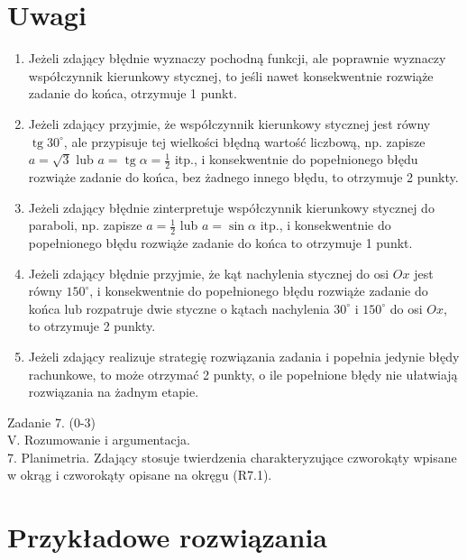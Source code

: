 \documentclass[10pt]{article}
\begin{document}
\section*{Uwagi}
\begin{enumerate}
  \item Jeżeli zdający błędnie wyznaczy pochodną funkcji, ale poprawnie wyznaczy współczynnik kierunkowy stycznej, to jeśli nawet konsekwentnie rozwiąże zadanie do końca, otrzymuje 1 punkt.
  \item Jeżeli zdający przyjmie, że współczynnik kierunkowy stycznej jest równy $\operatorname{tg} 30^{\circ}$, ale przypisuje tej wielkości błędną wartość liczbową, np. zapisze $a=\sqrt{3}$ lub $a=\operatorname{tg} \alpha=\frac{1}{2}$ itp., i konsekwentnie do popełnionego błędu rozwiąże zadanie do końca, bez żadnego innego błędu, to otrzymuje 2 punkty.
  \item Jeżeli zdający błędnie zinterpretuje współczynnik kierunkowy stycznej do paraboli, np. zapisze $a=\frac{1}{2}$ lub $a=\sin \alpha$ itp., i konsekwentnie do popełnionego błędu rozwiąże zadanie do końca to otrzymuje 1 punkt.
  \item Jeżeli zdający błędnie przyjmie, że kąt nachylenia stycznej do osi $O x$ jest równy $150^{\circ}$, i konsekwentnie do popełnionego błędu rozwiąże zadanie do końca lub rozpatruje dwie styczne o kątach nachylenia $30^{\circ}$ i $150^{\circ}$ do osi $O x$, to otrzymuje 2 punkty.
  \item Jeżeli zdający realizuje strategię rozwiązania zadania i popełnia jedynie błędy rachunkowe, to może otrzymać 2 punkty, o ile popełnione błędy nie ułatwiają rozwiązania na żadnym etapie.
\end{enumerate}

Zadanie 7. (0-3)\\
V. Rozumowanie i argumentacja.\\
7. Planimetria. Zdający stosuje twierdzenia charakteryzujące czworokąty wpisane w okrąg i czworokąty opisane na okręgu (R7.1).

\section*{Przykładowe rozwiązania}
\end{document}
